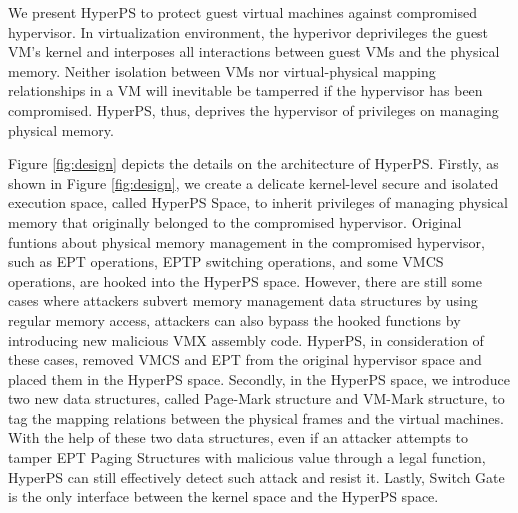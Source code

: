 We present HyperPS to protect guest virtual machines against compromised hypervisor. In virtualization environment, the hyperivor deprivileges the guest VM’s kernel and interposes all interactions between guest VMs and the physical memory. Neither isolation between VMs nor virtual-physical mapping relationships in a VM will inevitable be tamperred if the hypervisor has been compromised. HyperPS, thus, deprives the hypervisor of privileges on managing physical memory.


Figure \ref{fig:design} depicts the details on the architecture of HyperPS. 
Firstly, as shown in Figure \ref{fig:design}, we create a delicate kernel-level secure and isolated execution space, called HyperPS Space, to inherit privileges of managing physical memory that originally belonged to the compromised hypervisor. 
Original funtions about physical memory management in the compromised hypervisor, such as EPT operations, EPTP switching operations, and some VMCS operations, are hooked into the HyperPS space. 
However, there are still some cases where attackers subvert memory management data structures by using regular memory access, attackers can also bypass the hooked functions by introducing new malicious VMX assembly code. HyperPS, in consideration of these cases, removed VMCS and EPT from the original hypervisor space and placed them in the HyperPS space. 
Secondly, in the HyperPS space, we introduce two new data structures, called Page-Mark structure and VM-Mark structure, to tag the mapping relations between the physical frames and the virtual machines. With the help of these two data structures, even if an attacker attempts to tamper EPT Paging Structures with malicious value through a legal function, HyperPS can still effectively detect such attack and resist it.
Lastly, Switch Gate is the only interface between the kernel space and the HyperPS space.


